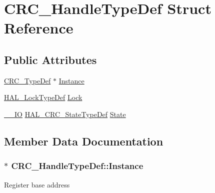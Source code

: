 \hypertarget{struct_c_r_c___handle_type_def}{}\section{C\+R\+C\+\_\+\+Handle\+Type\+Def Struct Reference}
\label{struct_c_r_c___handle_type_def}
\subsection*{Public Attributes}
\begin{DoxyCompactItemize}
\item 
\hyperlink{struct_c_r_c___type_def}{C\+R\+C\+\_\+\+Type\+Def} $\ast$ \hyperlink{struct_c_r_c___handle_type_def_a729fb3fc0f6d94bef9ec1b48a8a65221}{Instance}
\item 
\hyperlink{stm32f4xx__hal__def_8h_ab367482e943333a1299294eadaad284b}{H\+A\+L\+\_\+\+Lock\+Type\+Def} \hyperlink{struct_c_r_c___handle_type_def_a8424c2419e573117042e58d10ebe2e8f}{Lock}
\item 
\hyperlink{core__sc300_8h_aec43007d9998a0a0e01faede4133d6be}{\+\_\+\+\_\+\+IO} \hyperlink{group___c_r_c___exported___types___group1_ga1021d6f27a072d45f6f3b233eefd8bbe}{H\+A\+L\+\_\+\+C\+R\+C\+\_\+\+State\+Type\+Def} \hyperlink{struct_c_r_c___handle_type_def_a401f5c24d8e1fbe904234802d53c4f43}{State}
\end{DoxyCompactItemize}


\subsection{Member Data Documentation}
\subsubsection[{\texorpdfstring{Instance}{Instance}}]{$\ast$ C\+R\+C\+\_\+\+Handle\+Type\+Def\+::\+Instance}\hypertarget{struct_c_r_c___handle_type_def_a729fb3fc0f6d94bef9ec1b48a8a65221}{}\label{struct_c_r_c___handle_type_def_a729fb3fc0f6d94bef9ec1b48a8a65221}
Register base address 
